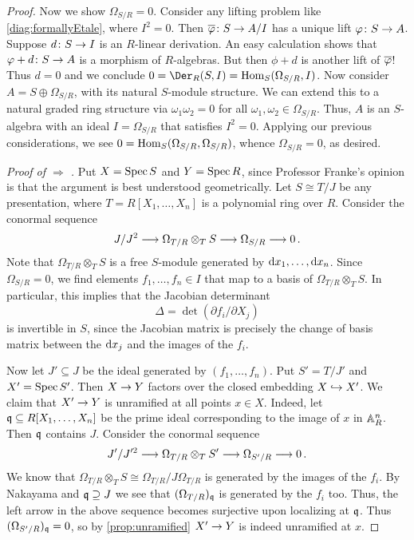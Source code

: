 \begin{proof}
	Now we show $\Omega_{S/R}=0$. Consider any lifting problem like \cref{diag:formallyEtale}, where $I^2=0$. Then $\ov{\phi}\colon S\morphism A/I$ has a unique lift $\phi\colon S\morphism A$. Suppose $d\colon S\morphism I$ is an $R$-linear derivation. An easy calculation shows that $\phi+d\colon S\morphism A$ is a morphism of $R$-algebras. But then $\phi+d$ is another lift of $\ov{\phi}$! Thus $d=0$ and we conclude $0=\Der_R(S,I)=\Hom_S(\Omega_{S/R},I)$. Now consider $A=S\oplus\Omega_{S/R}$, with its natural $S$-module structure. We can extend this to a natural graded ring structure via $\omega_1\omega_2=0$ for all $\omega_1,\omega_2\in \Omega_{S/R}$. Thus, $A$ is an $S$-algebra with an ideal $I=\Omega_{S/R}$ that satisfies $I^2=0$. Applying our previous considerations, we see $0=\operatorname{Hom}_S(\Omega_{S/R},\Omega_{S/R})$, whence $\Omega_{S/R}=0$, as desired.
	
	\emph{Proof of  $\Rightarrow$ .} Put $X=\operatorname{Spec} S$ and $Y=\operatorname{Spec} R$, since Professor Franke's opinion is that the argument is best understood geometrically. Let $S\cong T/J$ be any presentation, where $T=R[X_1,\dotsc,X_n]$ is a polynomial ring over $R$. Consider the conormal sequence
	\begin{equation*}
		J/J^2\morphism\Omega_{T/R}\otimes_TS\morphism\Omega_{S/R}\morphism 0\,.
	\end{equation*}
	Note that $\Omega_{T/R}\otimes_TS$ is a free $S$-module generated by $\mathrm{d} x_1,\dotsc,\mathrm{d} x_n$. Since $\Omega_{S/R}=0$, we find elements $f_1,\dotsc,f_n\in I$ that map to a basis of $\Omega_{T/R}\otimes_TS$. In particular, this implies that the Jacobian determinant
	\begin{equation*}
		\Delta=\det\left(\partial f_i/\partial X_j\right)
	\end{equation*}
	is invertible in $S$, since the Jacobian matrix is precisely the change of basis matrix between the $\mathrm{d} x_j$ and the images of the $f_i$.
	
	Now let $J'\subseteq J$ be the ideal generated by $(f_1,\dotsc,f_n)$. Put $S'=T/J'$ and $X'=\operatorname{Spec} S'$. Then $X\morphism Y$ factors over the closed embedding $X\monomorphism X'$. We claim that $X'\morphism Y$ is unramified at all points $x\in X$. Indeed, let $\mathfrak{q}\subseteq R[X_1,\dotsc,X_n]$ be the prime ideal corresponding to the image of $x$ in $\mathbb{A}_R^n$. Then $\mathfrak{q}$ contains $J$. Consider the conormal sequence
	\begin{equation*}
		J'/J'^2\morphism \Omega_{T/R}\otimes_TS'\morphism \Omega_{S'/R}\morphism 0\,.
	\end{equation*}
	We know that $\Omega_{T/R}\otimes_TS\cong \Omega_{T/R}/J\Omega_{T/R}$ is generated by the images of the $f_i$. By Nakayama and $\mathfrak{q}\supseteq J$ we see that $(\Omega_{T/R})_{\mathfrak{q}}$ is generated by the $f_i$ too. Thus, the left arrow in the above sequence becomes surjective upon localizing at $\mathfrak{q}$. Thus $(\Omega_{S'/R})_{\mathfrak{q}}=0$, so by \cref{prop:unramified} $X'\morphism Y$ is indeed unramified at $x$.
	

\end{proof}
